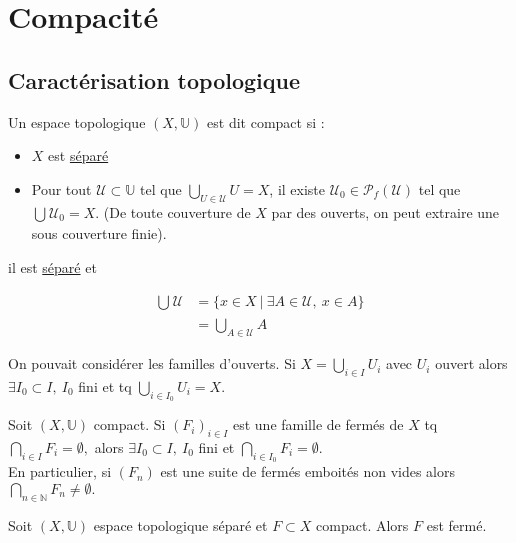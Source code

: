 \newcommand\dif\partial
\newcommand\dd{\mathrm{d}}
\section{Compacité}
\subsection{Caractérisation topologique}
\begin{definition}
    Un espace topologique $(X,\mathbb{U})$ est dit compact si :
    \begin{itemize}
        \item $X$ est \underline{séparé}
        \item Pour tout $\mathcal{U}\subset \mathbb{U}$ tel que $\bigcup_{U \in \mathcal{U}}U=X$, il existe $\mathcal{U}_0 \in \mathcal{P}_f(\mathcal{U})$ 
 tel que $\bigcup\limits_{} \mathcal{U}_0=X$. (De toute couverture de $X$ par des ouverts, on peut extraire une sous couverture finie).
    \end{itemize}
    il est \underline{séparé} et 
\end{definition}
\begin{remarque}
    \begin{align*}
        \bigcup\limits_{} \mathcal{U}&=\{x\in X\ |\ \exists A\in \mathcal{U},\ x\in A\}\\
                                     &=\bigcup\limits_{A\in \mathcal{U}} A
     \end{align*}
\end{remarque}
\begin{remarque}
    On pouvait considérer les familles d'ouverts. Si $X=\bigcup\limits_{i\in I} U_i$ avec $U_i$ ouvert alors $\exists I_0\subset I,\ I_0 $ fini et tq $\bigcup\limits_{i\in I_0} U_i=X$.
\end{remarque}
\begin{remarque}
   Soit $(X,\mathbb{U})$ compact. Si $(F_i)_{i\in I}$ est une famille de fermés de $X$ tq $\bigcap\limits_{i\in I} F_i=\emptyset ,$ alors $\exists I_0\subset I,\ I_0$ fini et $\bigcap\limits_{i\in I_0} F_i=\emptyset $.\\
   En particulier, si $(F_n)$ est une suite de fermés emboités non vides alors $\bigcap\limits_{n\in \mathbb{N} } F_n\neq \emptyset .$
\end{remarque}
\begin{lemme}
    Soit $(X,\mathbb{U})$ espace topologique séparé et $F\subset X$ compact. Alors $F$ est fermé.
\end{lemme}
